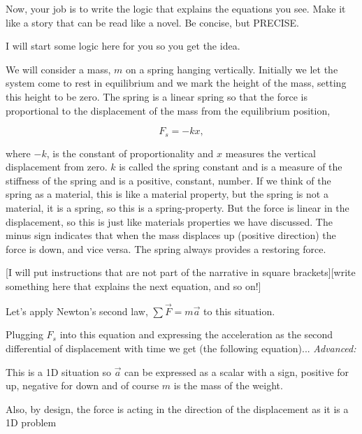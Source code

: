\documentclass[]{revtex4}
\newcommand{\st}[1]{{\color{red}\bfseries #1}}
\begin{document}
Now, your job is to write the logic that explains the equations you see.  Make it like a story that can be read like a novel.  Be concise, but PRECISE.

I will start some logic here for you so you get the idea.

We will consider a mass, $m$ on a spring hanging vertically.  Initially we let the system come to rest in equilibrium and we mark the height of the mass, setting this height to be zero.  The spring is a linear spring so that the force is proportional to the displacement of the mass from the equilibrium position, 

\[F_s = - kx,\]

where $-k$, is the constant of proportionality and $x$ measures the vertical displacement from zero.  $k$ is called the spring constant and is a measure of the stiffness of the spring and is a positive, constant, number.  If we think of the spring as a material, this is like a material property, but the spring is not a material, it is a spring, so this is a spring-property. But the force is linear in the displacement, so this is just like materials properties we have discussed.  The minus sign indicates that when the mass displaces up (positive direction) the force is down, and vice versa.  The spring always provides a restoring force.

[I will put instructions that are not part of the narrative in square brackets][write something here that explains the next equation, and so on!]\\ 

\st{
\bi
\item Let's apply Newton's second law, $\sum \vec{F} = m\vec{a}$ to this situation.  
\item Plugging $F_s$ into this equation and expressing the acceleration as the second differential of displacement with time we get (the following equation)...
\ei
{\it Advanced:}
\bi
\item This is a 1D situation so $\vec{a}$ can be expressed as a scalar with a sign, positive for up, negative for down and of course $m$ is the mass of the weight.
\item Also, by design, the force is acting in the direction of the displacement as it is a 1D problem
\ei
}
\end{document}
